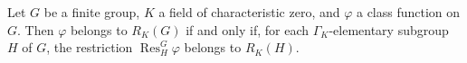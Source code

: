 Let $G$ be a finite group, $K$ a field of characteristic zero, and $\varphi$ a class function on $G$. Then $\varphi$ belongs to $R_K(G)$ if and only if, for each $\Gamma_K$-elementary subgroup $H$ of $G$, the restriction $\operatorname{Res}_H^G \varphi$ belongs to $R_K(H)$.
